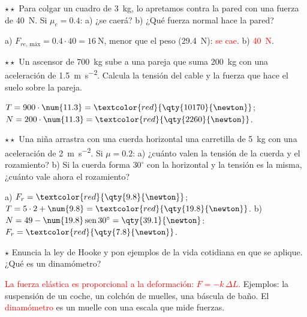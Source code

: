 \begin{exercise}
    \(\star\star\) Para colgar un cuadro de \qty{3}{\kg}, lo apretamos contra la pared con una fuerza de \qty{40}{\newton}. Si
    \(\mu_e = \num{0.4}\): a) ¿se caerá? b) ¿Qué fuerza normal hace la pared?
    \begin{solu}
        a) \(F_{re,\,\text{máx}} = \num{0.4} \cdot 40 = \qty{16}{\newton}\), menor que el peso (\qty{29.4}{\newton}): \textcolor{red}{se cae}.
        b) \textcolor{red}{\qty{40}{\newton}}.
    \end{solu}
\end{exercise}

\begin{exercise}
    \(\star\star\) Un ascensor de \qty{700}{\kg} sube a una pareja que suma \qty{200}{\kg} con una aceleración de \qty{1.5}{\m\per\s\squared}.
    Calcula la tensión del cable y la fuerza que hace el suelo sobre la pareja.
    \begin{solu}
        \(T = 900 \cdot \num{11.3} = \textcolor{red}{\qty{10170}{\newton}}\); \(N = 200 \cdot \num{11.3} = \textcolor{red}{\qty{2260}{\newton}}\).
    \end{solu}
\end{exercise}

\begin{exercise}
    \(\star\star\) Una niña arrastra con una cuerda horizontal una carretilla de \qty{5}{\kg} con una aceleración de \qty{2}{\m\per\s\squared}.
    Si \(\mu = \num{0.2}\): a) ¿cuánto valen la tensión de la cuerda y el rozamiento? b) Si la cuerda forma \(30^\circ\) con la horizontal
    y la tensión es la misma, ¿cuánto vale ahora el rozamiento?
    \begin{solu}
        a) \(F_r = \textcolor{red}{\qty{9.8}{\newton}}\); \(T = 5 \cdot 2 + \num{9.8} = \textcolor{red}{\qty{19.8}{\newton}}\).
        b) \(N = 49 - \num{19.8}\sen 30^\circ = \qty{39.1}{\newton}\): \(F_r = \textcolor{red}{\qty{7.8}{\newton}}\).
    \end{solu}
\end{exercise}

\begin{exercise}
    \(\star\) Enuncia la ley de Hooke y pon ejemplos de la vida cotidiana en que se aplique. ¿Qué es un dinamómetro?
    \begin{solu}
        \textcolor{red}{La fuerza elástica es proporcional a la deformación: \(F = -k\,\Delta L\).} Ejemplos: la suspensión de un coche,
        un colchón de muelles, una báscula de baño. El \textcolor{red}{dinamómetro} es un muelle con una escala que mide fuerzas.
    \end{solu}
\end{exercise}

